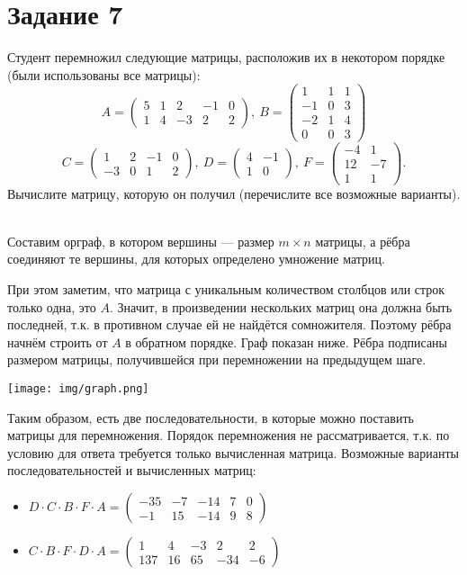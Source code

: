 \documentclass[a4paper,12pt]{article}
\begin{document}
\section*{Задание 7}
Студент перемножил следующие матрицы, расположив их в некотором порядке (были использованы все матрицы):
$$
A = 
\begin{pmatrix}
5 & 1 & 2 & -1 & 0\\
1 & 4 & -3 & 2 & 2
\end{pmatrix}, \
B =\begin{pmatrix}
1 & 1 & 1\\
-1 & 0 & 3\\
-2 & 1 & 4\\
0 & 0 & 3
\end{pmatrix}
$$
$$
C = \begin{pmatrix}
1 & 2 & -1 & 0\\
-3 & 0 & 1 & 2
\end{pmatrix},\
D = 
\begin{pmatrix}
4 & -1\\
1 & 0
\end{pmatrix}, \
F = \begin{pmatrix}
-4 & 1\\
12 & -7\\
1 & 1
\end{pmatrix}.
$$
Вычислите матрицу, которую он получил (перечислите все возможные варианты).\par
{}\\
Составим орграф, в котором вершины --- размер $m \times n$ матрицы, а рёбра соединяют те вершины, для которых определено умножение матриц.\par
При этом заметим, что матрица с уникальным количеством столбцов или строк только одна, это $A$. Значит, в произведении нескольких матриц она должна быть последней, т.к. в противном случае ей не найдётся сомножителя. Поэтому рёбра начнём строить от $A$ в обратном порядке. Граф показан ниже. Рёбра подписаны размером матрицы, получившейся при перемножении на предыдущем шаге. \par
\centerline{\texttt{[image: img/graph.png]}}
Таким образом, есть две последовательности, в которые можно поставить матрицы для перемножения. Порядок перемножения не рассматривается, т.к. по условию для ответа требуется только вычисленная матрица. Возможные варианты последовательностей и вычисленных матриц:
\begin{itemize}
\item $D \cdot C \cdot B \cdot F \cdot A=
\begin{pmatrix}
-35 & -7 & -14 & 7 & 0\\
-1 & 15 & -14 & 9 & 8
\end{pmatrix}$
\item $C \cdot B \cdot F \cdot D \cdot A=
\begin{pmatrix}
1 & 4 & -3 & 2 & 2\\
137 & 16 & 65 & -34 & -6
\end{pmatrix}$
\end{itemize}
\end{document}
